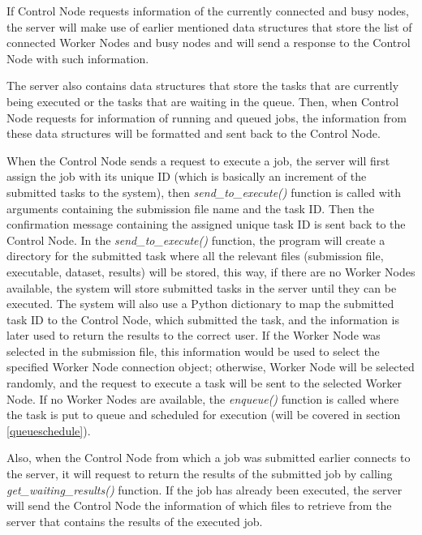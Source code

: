 \documentclass[10pt]{report}
\begin{document}
If Control Node requests information of the currently connected and busy nodes, the server will make use of earlier mentioned data structures that store the list of connected Worker Nodes and busy nodes and will send a response to the Control Node with such information.
\newline

The server also contains data structures that store the tasks that are currently being executed or the tasks that are waiting in the queue. Then, when Control Node requests for information of running and queued jobs, the information from these data structures will be formatted and sent back to the Control Node.
\newline

When the Control Node sends a request to execute a job, the server will first assign the job with its unique ID (which is basically an increment of the submitted tasks to the system), then \textit{send\_to\_execute()} function is called with arguments containing the submission file name and the task ID. Then the confirmation message containing the assigned unique task ID is sent back to the Control Node. In the \textit{send\_to\_execute()} function, the program will create a directory for the submitted task where all the relevant files (submission file, executable, dataset, results) will be stored, this way, if there are no Worker Nodes available, the system will store submitted tasks in the server until they can be executed. The system will also use a Python dictionary to map the submitted task ID to the Control Node, which submitted the task, and the information is later used to return the results to the correct user. If the Worker Node was selected in the submission file, this information would be used to select the specified Worker Node connection object; otherwise, Worker Node will be selected randomly, and the request to execute a task will be sent to the selected Worker Node. If no Worker Nodes are available, the \textit{enqueue()} function is called where the task is put to queue and scheduled for execution (will be covered in section \ref{queueschedule}).
\newline

Also, when the Control Node from which a job was submitted earlier connects to the server, it will request to return the results of the submitted job by calling \textit{get\_waiting\_results()} function. If the job has already been executed, the server will send the Control Node the information of which files to retrieve from the server that contains the results of the executed job.
\end{document}
